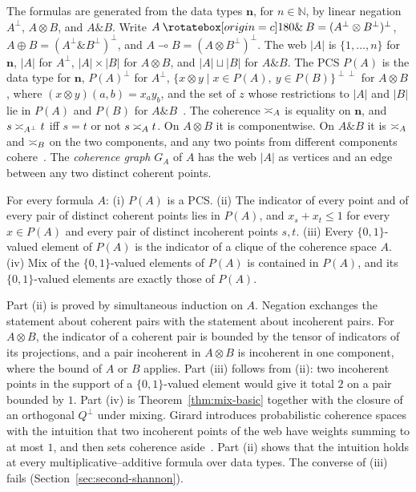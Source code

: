 \begin{definition}
\label{def:mall}
The formulas are generated from the data types $\mathbf{n}$, for
$n \in \mathbb{N}$, by linear negation $A^{\perp}$, $A \otimes B$, and
$A \mathbin{\&} B$. Write $A \parr B = (A^{\perp} \otimes B^{\perp})^{\perp}$,
$A \oplus B = (A^{\perp} \mathbin{\&} B^{\perp})^{\perp}$, and
$A \multimap B = (A \otimes B^{\perp})^{\perp}$. The web $|A|$ is
$\{1, \dots, n\}$ for $\mathbf{n}$, $|A|$ for $A^{\perp}$, $|A| \times |B|$
for $A \otimes B$, and $|A| \sqcup |B|$ for $A \mathbin{\&} B$. The PCS
$P(A)$ is the data type for $\mathbf{n}$, $P(A)^{\perp}$ for $A^{\perp}$,
$\{x \otimes y \mid x \in P(A),\ y \in P(B)\}^{\perp\perp}$ for
$A \otimes B$, where $(x \otimes y)(a,b) = x_a y_b$, and the set of $z$
whose restrictions to $|A|$ and $|B|$ lie in $P(A)$ and $P(B)$ for
$A \mathbin{\&} B$~\cite{danos-ehrhard2011}. The coherence $\mathrel{\asymp}_A$ is
equality on $\mathbf{n}$, and $s \mathrel{\asymp}_{A^{\perp}} t$ iff $s = t$ or not
$s \mathrel{\asymp}_A t$. On $A \otimes B$ it is componentwise. On $A \mathbin{\&} B$
it is $\mathrel{\asymp}_A$ and $\mathrel{\asymp}_B$ on the two components, and any two points from
different components cohere~\cite{girard1987}. The \emph{coherence
graph} $G_A$ of $A$ has the web $|A|$ as vertices and an edge between
any two distinct coherent points.
\end{definition}

\begin{theorem}
\label{thm:mall}
For every formula $A$:
(i) $P(A)$ is a PCS.
(ii) The indicator of every point and of every pair of distinct coherent
points lies in $P(A)$, and $x_s + x_t \le 1$ for every $x \in P(A)$ and
every pair of distinct incoherent points $s, t$.
(iii) Every $\{0,1\}$-valued element of $P(A)$ is the indicator of a
clique of the coherence space $A$.
(iv) $\mathrm{Mix}$ of the $\{0,1\}$-valued elements of $P(A)$ is
contained in $P(A)$, and its $\{0,1\}$-valued elements are exactly those
of $P(A)$.
\end{theorem}

\noindent
Part (ii) is proved by simultaneous induction on $A$. Negation exchanges
the statement about coherent pairs with the statement about incoherent
pairs. For $A \otimes B$, the indicator of a coherent pair is bounded by
the tensor of indicators of its projections, and a pair incoherent in
$A \otimes B$ is incoherent in one component, where the bound of $A$ or
$B$ applies. Part (iii) follows from (ii): two incoherent points in the
support of a $\{0,1\}$-valued element would give it total $2$ on a pair
bounded by $1$. Part (iv) is Theorem~\ref{thm:mix-basic} together with
the closure of an orthogonal $Q^{\perp}$ under mixing.
Girard introduces probabilistic coherence spaces with the intuition that
two incoherent points of the web have weights summing to at most $1$, and then sets
coherence aside~\cite{girard2004}. Part (ii) shows that the intuition
holds at every multiplicative--additive formula over data types. The
converse of (iii) fails (Section~\ref{sec:second-shannon}).

